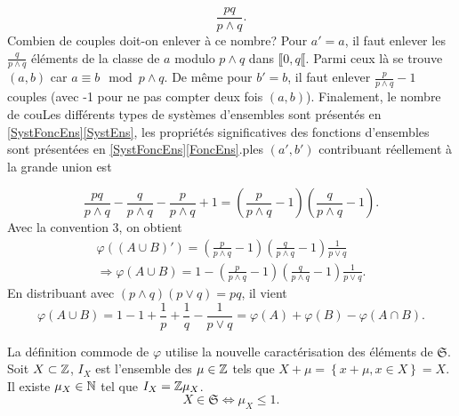 \begin{enumerate}
\begin{displaymath}
  \frac{pq}{p \wedge q}.
\end{displaymath}
Combien de couples doit-on enlever à ce nombre?\newline
Pour $a' = a$, il faut enlever les $\frac{q}{p \wedge q}$ éléments de la classe de $a$ modulo $p \wedge q$ dans $\llbracket 0, q\llbracket$. Parmi ceux là se trouve $(a,b)$ car $a \equiv b \mod p\wedge q$. De même pour $b' = b$, il faut enlever $\frac{p}{p \wedge q}-1$ couples (avec -1 pour ne pas compter deux fois $(a,b)$).\newline
Finalement, le nombre de couLes différents types de systèmes d'ensembles sont présentés en \ref{SystFoncEns}\ref{SystEns}, les propriétés significatives des fonctions d'ensembles sont présentées en \ref{SystFoncEns}\ref{FoncEns}.ples $(a',b')$ contribuant réellement à la grande union est

\begin{displaymath}
  \frac{pq}{p \wedge q} - \frac{q}{p \wedge q} - \frac{p}{p \wedge q} + 1 = \left(\frac{p}{p \wedge q}-1\right) \left(\frac{q}{p \wedge q}-1\right).
\end{displaymath}
Avec la convention 3, on obtient
\begin{multline*}
  \varphi((A \cup B)') = \left(\frac{p}{p \wedge q}-1\right) \left(\frac{q}{p \wedge q}-1\right) \frac{1}{p \vee q}\\
  \Rightarrow
  \varphi(A \cup B) = 1 - \left(\frac{p}{p \wedge q}-1\right) \left(\frac{q}{p \wedge q}-1\right) \frac{1}{p \vee q}.
\end{multline*}
En distribuant avec $(p \wedge q)(p \vee q) = pq$, il vient
\begin{displaymath}
  \varphi(A \cup B) = 1 - 1 + \frac{1}{p} + \frac{1}{q} - \frac{1}{p \vee q} = \varphi(A) + \varphi(B) - \varphi(A\cap B).
\end{displaymath}
\end{enumerate}

La définition commode de $\varphi$ utilise la nouvelle caractérisation des éléments de $\mathfrak{S}$.\newline
Soit $X \subset \mathbb{Z}$, $I_X$ est l'ensemble des $\mu \in \mathbb{Z}$ tels que $X + \mu =\left\lbrace x + \mu , x\in X\right\rbrace = X$. Il existe $\mu_X \in \mathbb{N}$ tel que $I_X = \mathbb{Z} \mu_X$.
\begin{displaymath}
  X \in \mathfrak{S} \Leftrightarrow \mu_X \leq 1 .
\end{displaymath}

